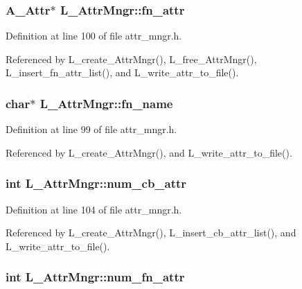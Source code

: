 \subsubsection{\setlength{\rightskip}{0pt plus 5cm}\bf{A\_\-Attr}$\ast$ \bf{L\_\-Attr\-Mngr::fn\_\-attr}}\label{structL__AttrMngr_1744bb75805c8174a651cc025482af25}




Definition at line 100 of file attr\_\-mngr.h.

Referenced by L\_\-create\_\-Attr\-Mngr(), L\_\-free\_\-Attr\-Mngr(), L\_\-insert\_\-fn\_\-attr\_\-list(), and L\_\-write\_\-attr\_\-to\_\-file().
\subsubsection{\setlength{\rightskip}{0pt plus 5cm}char$\ast$ \bf{L\_\-Attr\-Mngr::fn\_\-name}}\label{structL__AttrMngr_3038345b51e9612293efa271106ddb11}




Definition at line 99 of file attr\_\-mngr.h.

Referenced by L\_\-create\_\-Attr\-Mngr(), and L\_\-write\_\-attr\_\-to\_\-file().
\subsubsection{\setlength{\rightskip}{0pt plus 5cm}int \bf{L\_\-Attr\-Mngr::num\_\-cb\_\-attr}}\label{structL__AttrMngr_a378c1559df605e23e1f73733f5099aa}




Definition at line 104 of file attr\_\-mngr.h.

Referenced by L\_\-create\_\-Attr\-Mngr(), L\_\-insert\_\-cb\_\-attr\_\-list(), and L\_\-write\_\-attr\_\-to\_\-file().
\subsubsection{\setlength{\rightskip}{0pt plus 5cm}int \bf{L\_\-Attr\-Mngr::num\_\-fn\_\-attr}}\label{structL__AttrMngr_89263ed767f405eae14544bccc31e3fd}




